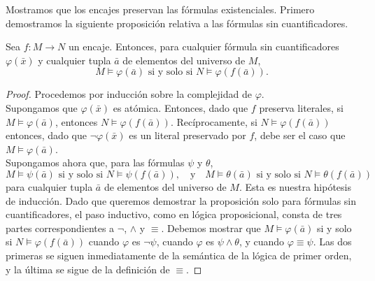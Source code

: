 \message{ !name(main.tex)}\documentclass[12pt,a4paper]{book}
\begin{document}
    Mostramos que los encajes preservan las fórmulas existenciales. Primero demostramos la siguiente proposición relativa
    a las fórmulas sin cuantificadores.

    \begin{proposicion}\label{prop:encaje-preserva-sin-cuantificadores}
        Sea $f:M\rightarrow N$ un encaje. Entonces, para cualquier fórmula sin cuantificadores $\varphi(\bar{x})$ y
        cualquier tupla $\bar{a}$ de elementos del universo de $M$,
        \begin{equation*}
            M\models\varphi(\bar{a})\text{ si y solo si }N\models\varphi(f(\bar{a})).
        \end{equation*}
    \end{proposicion}
    \begin{proof}
        Procedemos por inducción sobre la complejidad de $\varphi$.\\
        Supongamos que $\varphi(\bar{x})$ es atómica. Entonces, dado que $f$ preserva literales, si $M\models\varphi(\bar{a})$,
        entonces $N\models\varphi(f(\bar{a}))$. Recíprocamente, si $N\models\varphi(f(\bar{a}))$ entonces, dado que
        $\neg\varphi(\bar{x})$ es un literal preservado por $f$, debe ser el caso que $M\models\varphi(\bar{a})$.\\
        Supongamos ahora que, para las fórmulas $\psi$ y $\theta$,
        \begin{equation*}
            M\models\psi(\bar{a})\text{ si y solo si }N\models\psi(f(\bar{a})),\quad\text{y}\quad
            M\models\theta(\bar{a})\text{ si y solo si }N\models\theta(f(\bar{a}))
        \end{equation*}
        para cualquier tupla $\bar{a}$ de elementos del universo de $M$. Esta es nuestra hipótesis de inducción. Dado que
        queremos demostrar la proposición solo para fórmulas sin cuantificadores, el paso inductivo, como en lógica
        proposicional, consta de tres partes correspondientes a $\neg$, $\wedge$ y $\equiv$. Debemos mostrar que
        $M\models\varphi(\bar{a})$ si y solo si $N\models\varphi(f(\bar{a}))$ cuando $\varphi$ es $\neg\psi$, cuando
        $\varphi$ es $\psi\wedge\theta$, y cuando $\varphi\equiv\psi$. Las dos primeras se siguen inmediatamente de la
        semántica de la lógica de primer orden, y la última se sigue de la definición de $\equiv$.
    \end{proof}
\end{document}
